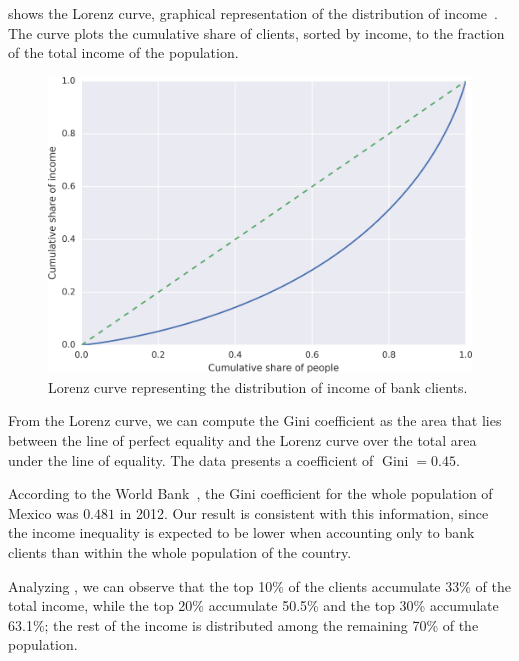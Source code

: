  shows the Lorenz curve, graphical representation of the distribution of income~\cite{satchell1987}. The curve plots the cumulative share of clients, sorted by income, to the fraction of the total income of the population.

\begin{figure}
\centering
\includegraphics[width=0.9\columnwidth]{figures/cumulative_income.png}
\caption{Lorenz curve representing the distribution of income of bank clients.}
\label{fig:income_distribution}
\end{figure}

From the Lorenz curve, we can compute the Gini coefficient as the area that lies between the line of perfect equality and the Lorenz curve over the total area under the line of equality. The data presents a coefficient of $\operatorname{Gini} = 0.45$.

According to the World Bank~\cite{world_bank}, the Gini coefficient for the whole population of Mexico was $0.481$ in 2012. Our result is consistent with this information, since the income inequality is expected to be lower when accounting only to bank clients than within the whole population of the country.

Analyzing , we can observe that the top 10\% of the clients accumulate 33\% of the total income, while the top 20\% accumulate 50.5\% and the top 30\% accumulate 63.1\%; the rest of the income is distributed among the remaining 70\% of the population.

